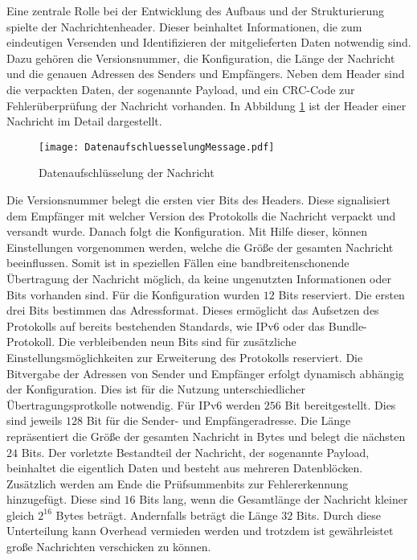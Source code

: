 \label{sec:ProtokolDesign}

Eine zentrale Rolle bei der Entwicklung des Aufbaus und der Strukturierung
spielte der Nachrichtenheader.
Dieser beinhaltet Informationen, die zum eindeutigen Versenden und Identifizieren der
mitgelieferten Daten notwendig sind. Dazu gehören die Versionsnummer,
die Konfiguration, die Länge der Nachricht und die genauen Adressen
des Senders und Empfängers. Neben dem Header sind die verpackten Daten, der
sogenannte Payload, und ein CRC-Code zur Fehlerüberprüfung der Nachricht
vorhanden. In Abbildung \ref{fig:DatenaufschluesselungMessage} ist der Header
einer Nachricht im Detail dargestellt.

\begin{figure}[H]
	\centering
	\texttt{[image: DatenaufschluesselungMessage.pdf]}
	\caption{Datenaufschlüsselung der Nachricht}
	\label{fig:DatenaufschluesselungMessage}
\end{figure}

Die Versionsnummer belegt die ersten vier Bits des Headers. Diese
signalisiert dem Empfänger mit welcher Version des Protokolls die Nachricht
verpackt und versandt wurde. Danach folgt die Konfiguration. Mit Hilfe dieser,
können Einstellungen vorgenommen werden, welche die Größe der gesamten Nachricht
beeinflussen. Somit ist in speziellen Fällen eine bandbreitenschonende
Übertragung der Nachricht möglich, da keine ungenutzten Informationen oder Bits
vorhanden sind. Für die Konfiguration wurden $12$ Bits reserviert. Die ersten drei Bits
bestimmen das Adressformat. Dieses ermöglicht das Aufsetzen des Protokolls auf
bereits bestehenden Standards, wie IPv6 oder das Bundle-Protokoll.
Die verbleibenden neun Bits sind für zusätzliche Einstellungsmöglichkeiten zur Erweiterung des
Protokolls reserviert. Die Bitvergabe der Adressen von Sender und Empfänger
erfolgt dynamisch abhängig der Konfiguration.
Dies ist für die Nutzung unterschiedlicher Übertragungsprotkolle notwendig.
Für IPv6 werden $256$ Bit bereitgestellt. Dies sind jeweils $128$ Bit für
die Sender- und Empfängeradresse. Die Länge repräsentiert die Größe der gesamten
Nachricht in Bytes und belegt die nächsten $24$ Bits.
Der vorletzte Bestandteil der Nachricht, der sogenannte Payload, beinhaltet die
eigentlich Daten und besteht aus mehreren Datenblöcken. Zusätzlich werden am
Ende die Prüfsummenbits zur Fehlererkennung hinzugefügt. Diese sind $16$ Bits lang,
wenn die Gesamtlänge der Nachricht kleiner gleich $2^{16}$ Bytes beträgt.
Andernfalls beträgt die Länge $32$ Bits. Durch diese Unterteilung kann
Overhead vermieden werden und trotzdem ist gewährleistet große Nachrichten
verschicken zu können.

